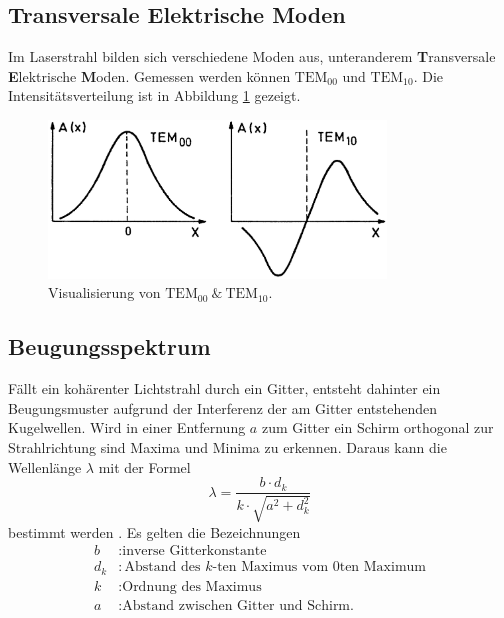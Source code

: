 \subsection{Transversale Elektrische Moden}
Im Laserstrahl bilden sich verschiedene Moden aus, unteranderem \textbf{T}ransversale \textbf{E}lektrische \textbf{M}oden.
Gemessen werden können $\text{TEM}_{00}$ und $\text{TEM}_{10}$.
Die Intensitätsverteilung ist in Abbildung \ref{fig:tem-theorie} gezeigt.
\begin{figure}
  \centering
  \includegraphics[width=0.8\textwidth]{images/tem-theorie.png}
  \caption{Visualisierung von $\text{TEM}_{00}\:\&\:\text{TEM}_{10}$. \cite{demtroeder}}
  \label{fig:tem-theorie}
\end{figure}

\FloatBarrier
\subsection{Beugungsspektrum}
Fällt ein kohärenter Lichtstrahl durch ein Gitter,
entsteht dahinter ein Beugungsmuster aufgrund der Interferenz der am Gitter entstehenden
Kugelwellen. Wird in einer Entfernung $a$ zum Gitter ein Schirm orthogonal zur Strahlrichtung
sind Maxima und Minima zu erkennen.
Daraus kann die Wellenlänge $λ$ mit der Formel
\begin{equation}
  λ = \frac{b\cdot d_k}{k\cdot\sqrt{a^2+d_k^2}}
  \label{eqn:gitter}
\end{equation}
bestimmt werden \cite{gitter}.
Es gelten die Bezeichnungen
\begin{align*}
  b &: \text{inverse Gitterkonstante} \\
  d_k &: \text{Abstand des $k$-ten Maximus vom 0ten Maximum} \\
  k &: \text{Ordnung des Maximus} \\
  a &: \text{Abstand zwischen Gitter und Schirm.}
\end{align*}
